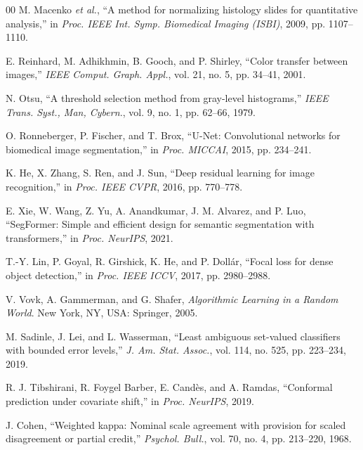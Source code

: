 \documentclass[conference]{IEEEtran}
\begin{document}
\begin{thebibliography}{00}
 M. Macenko \emph{et al.}, ``A method for normalizing
histology slides for quantitative analysis,'' in \emph{Proc. IEEE Int.
Symp. Biomedical Imaging (ISBI)}, 2009, pp. 1107--1110.

 E. Reinhard, M. Adhikhmin, B. Gooch, and P. Shirley,
``Color transfer between images,'' \emph{IEEE Comput. Graph. Appl.},
vol. 21, no. 5, pp. 34--41, 2001.

 N. Otsu, ``A threshold selection method from gray-level
histograms,'' \emph{IEEE Trans. Syst., Man, Cybern.}, vol. 9, no. 1,
pp. 62--66, 1979.

 O. Ronneberger, P. Fischer, and T. Brox, ``U-Net:
Convolutional networks for biomedical image segmentation,'' in \emph{Proc.
MICCAI}, 2015, pp. 234--241.

 K. He, X. Zhang, S. Ren, and J. Sun, ``Deep residual
learning for image recognition,'' in \emph{Proc. IEEE CVPR}, 2016,
pp. 770--778.

 E. Xie, W. Wang, Z. Yu, A. Anandkumar, J. M. Alvarez, and
P. Luo, ``SegFormer: Simple and efficient design for semantic segmentation
with transformers,'' in \emph{Proc. NeurIPS}, 2021.

 T.-Y. Lin, P. Goyal, R. Girshick, K. He, and P. Doll\'ar,
``Focal loss for dense object detection,'' in \emph{Proc. IEEE ICCV}, 2017,
pp. 2980--2988.

 V. Vovk, A. Gammerman, and G. Shafer, \emph{Algorithmic
Learning in a Random World}. New York, NY, USA: Springer, 2005.

 M. Sadinle, J. Lei, and L. Wasserman, ``Least
ambiguous set-valued classifiers with bounded error levels,'' \emph{J. Am.
Stat. Assoc.}, vol. 114, no. 525, pp. 223--234, 2019.

 R. J. Tibshirani, R. Foygel Barber, E. Cand\`es,
and A. Ramdas, ``Conformal prediction under covariate shift,'' in
\emph{Proc. NeurIPS}, 2019.

 J. Cohen, ``Weighted kappa: Nominal scale agreement
with provision for scaled disagreement or partial credit,'' \emph{Psychol.
Bull.}, vol. 70, no. 4, pp. 213--220, 1968.

\end{thebibliography}
\end{document}
